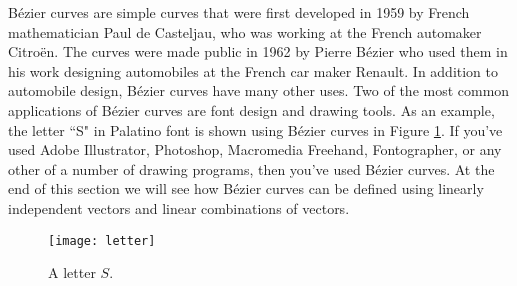  \label{sec:independence}

\vspace*{-17 pt}

\vspace*{13 pt}


B\'{e}zier curves are simple curves that were first developed in 1959 by French mathematician Paul de Casteljau, who was working at the French automaker Citro\"{e}n. The curves were made public in 1962 by Pierre B\'{e}zier who used them in his work designing automobiles at the French car maker Renault. In addition to automobile design, B\'{e}zier curves have many other uses. Two of the most common applications of B\'{e}zier curves are font design and drawing tools. As an example, the letter ``S" in Palatino font is shown using B\'{e}zier curves in Figure \ref{F:Letter_S}. If you've used Adobe Illustrator, Photoshop, Macromedia Freehand, Fontographer, or any other of a number of drawing programs, then you've used B\'{e}zier curves. At the end of this section we will see how B\'{e}zier curves can be defined using linearly independent vectors and linear combinations of vectors.  
\begin{figure}[ht] \centering
\texttt{[image: letter]}
\caption{A letter $S$.}
\label{F:Letter_S}
\end{figure}


